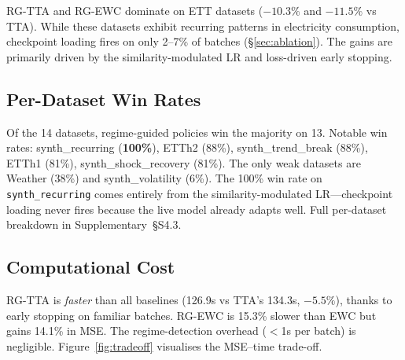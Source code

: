 \documentclass[journal]{IEEEtran}
\begin{document}
RG-TTA and RG-EWC dominate on ETT datasets ($-10.3\%$ and $-11.5\%$ vs TTA). While these datasets exhibit recurring patterns in electricity consumption, checkpoint loading fires on only 2--7\% of batches (\S\ref{sec:ablation}). The gains are primarily driven by the similarity-modulated LR and loss-driven early stopping.

\subsection{Per-Dataset Win Rates}

Of the 14 datasets, regime-guided policies win the majority on 13. Notable win rates: synth\_recurring (\textbf{100\%}), ETTh2 (88\%), synth\_trend\_break (88\%), ETTh1 (81\%), synth\_shock\_recovery (81\%). The only weak datasets are Weather (38\%) and synth\_volatility (6\%). The 100\% win rate on \texttt{synth\_recurring} comes entirely from the similarity-modulated LR---checkpoint loading never fires because the live model already adapts well. Full per-dataset breakdown in Supplementary~\S{S4.3}.

\subsection{Computational Cost}

\begin{table}[t]
\centering
\caption{Average total adaptation time (seconds) per experiment. Lower is better.}
\label{tab:time}
\small
{}%
\end{table}

RG-TTA is \emph{faster} than all baselines (126.9s vs TTA's 134.3s, $-5.5\%$), thanks to early stopping on familiar batches. RG-EWC is 15.3\% slower than EWC but gains 14.1\% in MSE. The regime-detection overhead ($<$1s per batch) is negligible. Figure~\ref{fig:tradeoff} visualises the MSE--time trade-off.
\end{document}
